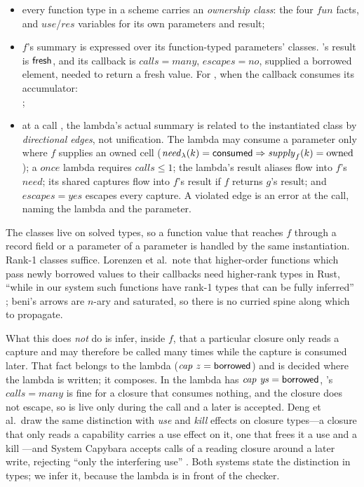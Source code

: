 \begin{itemize}
\item every function type in a scheme carries an \emph{ownership class}: the four
$\mathit{fun}$ facts, and $\mathit{use}$/$\mathit{res}$ variables for its own parameters and result;
\item $f$'s summary is expressed over its function-typed parameters' classes. 's result is
$\mathsf{fresh}$, and its callback is $\mathit{calls} = \mathit{many}$, $\mathit{escapes} = \mathit{no}$,
supplied a borrowed element, needed to return a fresh value. For , when the callback
consumes its accumulator:\\
;
\item at a call , the lambda's actual summary is related to the instantiated class by
\emph{directional edges}, not unification. The lambda may consume a parameter only where $f$ supplies
an owned cell ($\mathit{need}_\lambda(k) = \mathsf{consumed} \Rightarrow \mathit{supply}_f(k) =
\mathrm{owned}$); a $\mathit{once}$ lambda requires $\mathit{calls} \le 1$; the lambda's result
aliases flow into $f$'s $\mathit{need}$; its shared captures flow into $f$'s result if $f$ returns
$g$'s result; and $\mathit{escapes} = \mathit{yes}$ escapes every capture. A violated edge is an
error at the call, naming the lambda and the parameter.
\end{itemize}

The classes live on solved types, so a function value that reaches $f$ through a record field or a
parameter of a parameter is handled by the same instantiation. Rank-1 classes suffice. Lorenzen et
al.\ note that higher-order functions which pass newly borrowed values to their callbacks need
higher-rank types in Rust, ``while in our system such functions have rank-1 types that can be fully
inferred'' \citep[\S8.3]{lorenzen2024oxidizing}; beni's arrows are $n$-ary and saturated, so there is
no curried spine along which to propagate.

What this does \emph{not} do is infer, inside $f$, that a particular closure only reads a capture and
may therefore be called many times while the capture is consumed later. That fact belongs to the
lambda ($\mathit{cap}\ z = \mathsf{borrowed}$) and is decided where the lambda is written; it composes.
In  the lambda has $\mathit{cap}\ \mathit{ys} = \borrowed$,
's $\mathit{calls} = \mathit{many}$ is fine for a closure that consumes nothing, and the
closure does not escape, so  is live only during the  call and a later
 is accepted. Deng et al.\ draw the same distinction with \emph{use} and \emph{kill} effects on closure
types---a closure that only reads a capability carries a use effect on it, one that frees it a use
and a kill \citep[Fig.~1]{deng2025capture}---and System Capybara accepts calls of a reading closure
around a later write, rejecting ``only the interfering use'' \citep[\S2]{xu2026capybara}. Both
systems state the distinction in types; we infer it, because the lambda is in front of the checker.

